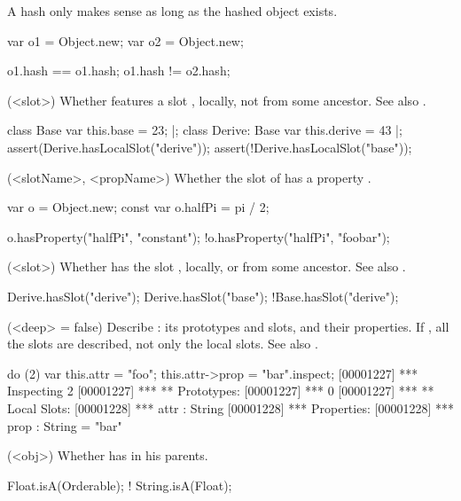 \begin{urbiscriptapi}
  A hash only makes sense as long as the hashed object exists.

\begin{urbiassert}
var o1 = Object.new;
var o2 = Object.new;

o1.hash == o1.hash;
o1.hash != o2.hash;
\end{urbiassert}

\item[hasLocalSlot](<slot>)%
  Whether \this features a slot , locally, not
  from some ancestor.  See also .
\begin{urbiscript}
class Base         { var this.base = 23; } |;
class Derive: Base { var this.derive = 43 } |;
assert(Derive.hasLocalSlot("derive"));
assert(!Derive.hasLocalSlot("base"));
\end{urbiscript}

\item[hasProperty](<slotName>, <propName>)%
  Whether the slot  of \this has a property .
\begin{urbiassert}
var o = Object.new;
const var o.halfPi = pi / 2;

 o.hasProperty("halfPi", "constant");
!o.hasProperty("halfPi", "foobar");
\end{urbiassert}

\item[hasSlot](<slot>)%
  Whether \this has the slot , locally, or from
  some ancestor.  See also .

\begin{urbiassert}
Derive.hasSlot("derive");
Derive.hasSlot("base");
!Base.hasSlot("derive");
\end{urbiassert}

\item['$id']%

\item[inspect](<deep> = false)%
  Describe \this: its prototypes and slots, and their
  properties.  If , all the slots are described, not only
  the local slots. See also .
\begin{urbiscript}
do (2) { var this.attr = "foo"; this.attr->prop = "bar"}.inspect;
[00001227] *** Inspecting 2
[00001227] *** ** Prototypes:
[00001227] ***   0
[00001227] *** ** Local Slots:
[00001228] ***   attr : String
[00001228] ***     Properties:
[00001228] ***      prop : String = "bar"
\end{urbiscript}

\item[isA](<obj>)%
  Whether \this has  in his parents.
\begin{urbiassert}
   Float.isA(Orderable);
! String.isA(Float);
\end{urbiassert}


\end{urbiscriptapi}
